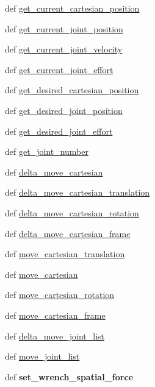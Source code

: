 \begin{DoxyCompactItemize}
\item 
def \hyperlink{classarm_1_1arm_ac893260c5e3edc669db9c4b8658f41b5}{get\-\_\-current\-\_\-cartesian\-\_\-position}
\item 
def \hyperlink{classarm_1_1arm_a7bea36edebe3da880a74ec93143a6c75}{get\-\_\-current\-\_\-joint\-\_\-position}
\item 
def \hyperlink{classarm_1_1arm_a0bd1909fb2e302139bf0e4fac8ae456a}{get\-\_\-current\-\_\-joint\-\_\-velocity}
\item 
def \hyperlink{classarm_1_1arm_ae735b4510a3ef3a27b354a6d569907a6}{get\-\_\-current\-\_\-joint\-\_\-effort}
\item 
def \hyperlink{classarm_1_1arm_ab1b18a438ae056c2ba3e845ec2d5216d}{get\-\_\-desired\-\_\-cartesian\-\_\-position}
\item 
def \hyperlink{classarm_1_1arm_a690f5778bad590b39daa32676bbf3182}{get\-\_\-desired\-\_\-joint\-\_\-position}
\item 
def \hyperlink{classarm_1_1arm_a6f56c0ea86dbc842477a68d1da2ac8f6}{get\-\_\-desired\-\_\-joint\-\_\-effort}
\item 
def \hyperlink{classarm_1_1arm_ae80a7d886ac4ea721b4f5df9154f71e4}{get\-\_\-joint\-\_\-number}
\item 
def \hyperlink{classarm_1_1arm_a535bf7aba9ae2891e0a4001cf03661eb}{delta\-\_\-move\-\_\-cartesian}
\item 
def \hyperlink{classarm_1_1arm_aa0cd1135ad795d39ab9475d4f93615bd}{delta\-\_\-move\-\_\-cartesian\-\_\-translation}
\item 
def \hyperlink{classarm_1_1arm_a04ee6edf5b8efe4db259ec7c4f57ee27}{delta\-\_\-move\-\_\-cartesian\-\_\-rotation}
\item 
def \hyperlink{classarm_1_1arm_a0a8751d7ea8ed4ddaf189aed05d72056}{delta\-\_\-move\-\_\-cartesian\-\_\-frame}
\item 
def \hyperlink{classarm_1_1arm_aadb93a6723fb938b75179c1099aa0eca}{move\-\_\-cartesian\-\_\-translation}
\item 
def \hyperlink{classarm_1_1arm_abe86423b4ee21e10d4f45e9dcd92e847}{move\-\_\-cartesian}
\item 
def \hyperlink{classarm_1_1arm_a121642945982da05247c1503fd0a12b9}{move\-\_\-cartesian\-\_\-rotation}
\item 
def \hyperlink{classarm_1_1arm_abfd2494a98ab9cfaccbf4f45f752853e}{move\-\_\-cartesian\-\_\-frame}
\item 
def \hyperlink{classarm_1_1arm_ac483a643a773ab9e14f95c8ec6bdd80a}{delta\-\_\-move\-\_\-joint\-\_\-list}
\item 
def \hyperlink{classarm_1_1arm_a4df0b8f7f9c390f088198f742a340b4a}{move\-\_\-joint\-\_\-list}
\item 
\hypertarget{classarm_1_1arm_aec0abfdbbb95bd56b226ebbf01067b16}{def {\bfseries set\-\_\-wrench\-\_\-spatial\-\_\-force}}\label{classarm_1_1arm_aec0abfdbbb95bd56b226ebbf01067b16}


\end{DoxyCompactItemize}

